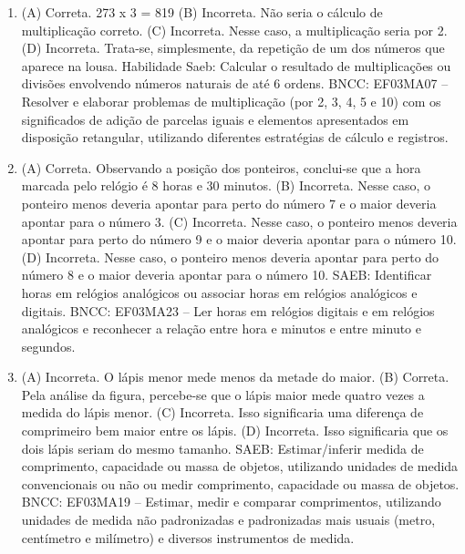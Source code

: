 \begin{enumerate}
\item
(A) Correta. 273 x 3 = 819
(B) Incorreta. Não seria o cálculo de multiplicação correto.
(C) Incorreta. Nesse caso, a multiplicação seria por 2.
(D) Incorreta. Trata-se, simplesmente, da repetição de um dos números que aparece na lousa.
Habilidade Saeb: Calcular o resultado de multiplicações ou divisões
envolvendo números naturais de até 6 ordens.
BNCC: EF03MA07 – Resolver e elaborar problemas de multiplicação (por 2, 3, 4, 5 e 10) com os
significados de adição de parcelas iguais e elementos apresentados em disposição retangular,
utilizando diferentes estratégias de cálculo e registros.

\item
(A) Correta. Observando a posição dos ponteiros, conclui-se que a hora marcada pelo
relógio é 8 horas e 30 minutos.
(B) Incorreta. Nesse caso, o ponteiro menos deveria apontar para perto do número 7 e o maior deveria apontar para o número 3.
(C) Incorreta. Nesse caso, o ponteiro menos deveria apontar para perto do número 9 e o maior deveria apontar para o número 10.
(D) Incorreta. Nesse caso, o ponteiro menos deveria apontar para perto do número 8 e o maior deveria apontar para o número 10.
SAEB: Identificar horas em relógios analógicos ou associar
horas em relógios analógicos e digitais.
BNCC: EF03MA23 – Ler horas em relógios digitais e em relógios analógicos e reconhecer a relação
entre hora e minutos e entre minuto e segundos.

\item
(A) Incorreta. O lápis menor mede menos da metade do maior.
(B) Correta. Pela análise da figura, percebe-se que o lápis maior mede quatro vezes a medida do lápis menor.
(C) Incorreta. Isso significaria uma diferença de comprimeiro bem maior entre os lápis.
(D) Incorreta. Isso significaria que os dois lápis seriam do mesmo tamanho.
SAEB: Estimar/inferir medida de comprimento, capacidade ou
massa de objetos, utilizando unidades de medida convencionais ou não ou
medir comprimento, capacidade ou massa de objetos.
BNCC: EF03MA19 -- Estimar, medir e comparar comprimentos, utilizando unidades de medida
não padronizadas e padronizadas mais usuais (metro, centímetro e milímetro) e diversos
instrumentos de medida.
\end{enumerate}


